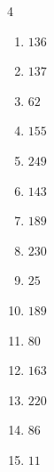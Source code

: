 \begin{multicols}{4}
\begin{enumerate}

  \item $136$


  \item $137$


  \item $62$


  \item $155$


  \item $249$


  \item $143$


  \item $189$


\columnbreak %

  \item $230$


  \item $25$


  \item $189$


  \item $80$


  \item $163$


  \item $220$


  \item $86$


  \item $11$



\end{enumerate}
\end{multicols}
